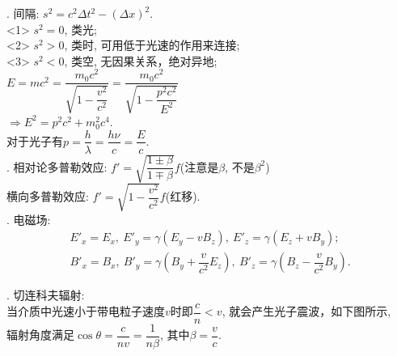 \documentclass[12pt, 
]{article}
\begin{document}
\begin{figure}
\vspace{-1.2cm}
\hspace{-2,5cm}
\label{fg:14}
\end{figure}

. 间隔: $s^2=c^2\Delta t^2-(\Delta x)^2$.
~\\\phantom{~~~~~~~~}<1> $s^2=0$, 类光;
~\\\phantom{~~~~~~~~}<2> $s^2>0$, 类时, 可用低于光速的作用来连接;
~\\\phantom{~~~~~~~~}<3> $s^2<0$, 类空, 无因果关系，绝对异地;
~\\\phantom{~~~~}$E=mc^2=\dfrac{m_0c^2}{\sqrt{1-\dfrac{v^2}{c^2}}}=\dfrac{m_0c^2}{\sqrt{1-\dfrac{p^2c^2}{E^2}}}$
~\\\phantom{~~~~}$\Rightarrow E^2=p^2c^2+m_0^2c^4$.
~\\\phantom{~~~~}对于光子有$p=\dfrac{h}{\lambda}=\dfrac{h\nu}{c}=\dfrac{E}{c}$.
~\\

. 相对论多普勒效应: $f'=\sqrt{\dfrac{1\pm\beta}{1\mp\beta}}f$(注意是$\beta$, 不是$\beta^2$)
~\\\phantom{~~~~}横向多普勒效应: $f'=\sqrt{1-\dfrac{v^2}{c^2}}f$(红移).
~\\

. 电磁场:
\[
	\begin{array}{l}
		E'_x=E_x,~E'_y=\gamma(E_y-vB_z),~E'_z=\gamma(E_z+vB_y);\\
		B'_x=B_x,~B'_y=\gamma(B_y+\dfrac{v}{c^2}E_z),~B'_z=\gamma(B_z-\dfrac{v}{c^2}B_y).
	\end{array}
\]

. 切连科夫辐射:
~\\\phantom{~~~~~~}当介质中光速小于带电粒子速度$v$时即$\dfrac{c}{n}<v$, 就会产生光子震波，如下图所示, 
~\\\phantom{~~~~~~}辐射角度满足$\cos\theta=\dfrac{c}{nv}=\dfrac{1}{n\beta}$, 其中$\beta=\dfrac{v}{c}$.
\end{document}
